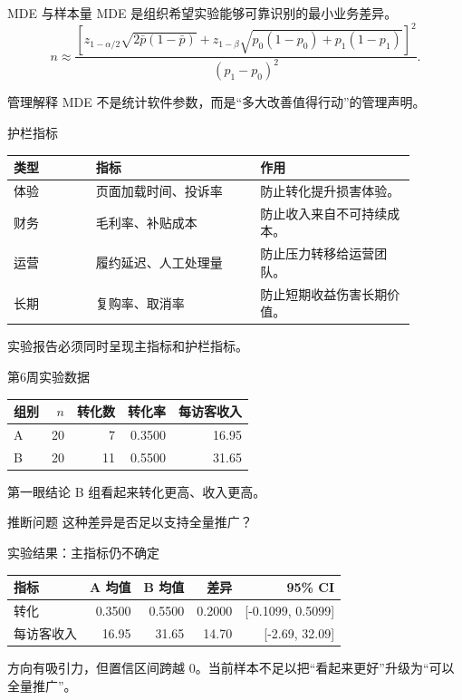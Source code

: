 \documentclass[UTF8,fontset=fandol,aspectratio=169,11pt]{ctexbeamer}
\begin{document}
\begin{frame}{MDE 与样本量}
\small
MDE 是组织希望实验能够可靠识别的最小业务差异。
\[
n
\approx
\frac{
\left[
z_{1-\alpha/2}\sqrt{2\bar p(1-\bar p)}
+
z_{1-\beta}\sqrt{p_0(1-p_0)+p_1(1-p_1)}
\right]^2
}{
(p_1-p_0)^2
}.
\]
\begin{block}{管理解释}
MDE 不是统计软件参数，而是“多大改善值得行动”的管理声明。
\end{block}
\end{frame}

\begin{frame}{护栏指标}
\begin{center}
\begin{tabular}{p{0.18\linewidth}p{0.36\linewidth}p{0.34\linewidth}}
\toprule
类型 & 指标 & 作用\\
\midrule
体验 & 页面加载时间、投诉率 & 防止转化提升损害体验。\\
财务 & 毛利率、补贴成本 & 防止收入来自不可持续成本。\\
运营 & 履约延迟、人工处理量 & 防止压力转移给运营团队。\\
长期 & 复购率、取消率 & 防止短期收益伤害长期价值。\\
\bottomrule
\end{tabular}
\end{center}
\vspace{0.2cm}
\small
实验报告必须同时呈现主指标和护栏指标。
\end{frame}

\begin{frame}{第6周实验数据}
\begin{center}
\begin{tabular}{lrrrr}
\toprule
组别 & \(n\) & 转化数 & 转化率 & 每访客收入\\
\midrule
A & 20 & 7 & 0.3500 & 16.95\\
B & 20 & 11 & 0.5500 & 31.65\\
\bottomrule
\end{tabular}
\end{center}
\vspace{0.3cm}
\begin{block}{第一眼结论}
B 组看起来转化更高、收入更高。
\end{block}
\begin{block}{推断问题}
这种差异是否足以支持全量推广？
\end{block}
\end{frame}

\begin{frame}{实验结果：主指标仍不确定}
\begin{center}
\begin{tabular}{lrrrr}
\toprule
指标 & A 均值 & B 均值 & 差异 & 95\% CI\\
\midrule
转化 & 0.3500 & 0.5500 & 0.2000 & [-0.1099, 0.5099]\\
每访客收入 & 16.95 & 31.65 & 14.70 & [-2.69, 32.09]\\
\bottomrule
\end{tabular}
\end{center}
\vspace{0.25cm}
\small
方向有吸引力，但置信区间跨越 0。当前样本不足以把“看起来更好”升级为“可以全量推广”。
\end{frame}
\end{document}
